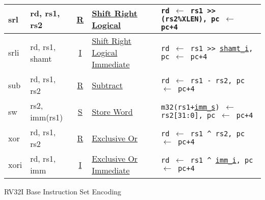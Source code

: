 {\begin{tabular}{|ll|c|l|l|}
\hline
srl   & rd, rs1, rs2   & \hyperref[insnformat:rtype]{R} & \hyperref[insn:srl]{Shift Right Logical}       & {\tt rd $\leftarrow$ rs1 >> (rs2\%XLEN), pc $\leftarrow$ pc+4}\\
\hline
srli  & rd, rs1, shamt & \hyperref[insnformat:itype]{I} & \hyperref[insn:srli]{Shift Right Logical Immediate} & {\tt rd $\leftarrow$ rs1 >> \hyperref[shamt.i:decode]{shamt\_i}, pc $\leftarrow$ pc+4}\\
\hline
sub   & rd, rs1, rs2   & \hyperref[insnformat:rtype]{R} & \hyperref[insn:sub]{Subtract}                  & {\tt rd $\leftarrow$ rs1 - rs2, pc $\leftarrow$ pc+4}\\
\hline
sw    & rs2, imm(rs1) & \hyperref[insnformat:stype]{S} & \hyperref[insn:sw]{Store Word}                  & {\tt m32(rs1+\hyperref[imm.s:decode]{imm\_s}) $\leftarrow$ rs2[31:0], pc $\leftarrow$ pc+4}\\
\hline
xor   & rd, rs1, rs2   & \hyperref[insnformat:rtype]{R} & \hyperref[insn:xor]{Exclusive Or}              & {\tt rd $\leftarrow$ rs1 \^{} rs2, pc $\leftarrow$ pc+4}\\
\hline
xori  & rd, rs1, imm  & \hyperref[insnformat:itype]{I} & \hyperref[insn:xori]{Exclusive Or Immediate}    & {\tt rd $\leftarrow$ rs1 \^{} \hyperref[imm.i:decode]{imm\_i}, pc $\leftarrow$ pc+4}\\
\hline
\end{tabular}
}

\newpage
{\Large RV32I Base Instruction Set Encoding}~\cite[p.~104]{rvismv1v22:2017}

\DrawAllInsnOps

